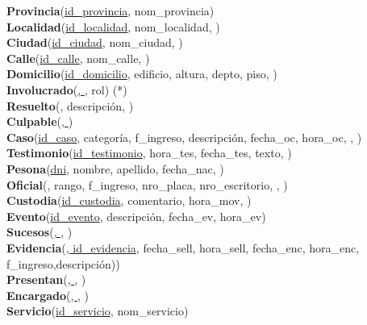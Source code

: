 \par
\noindent \textbf{Provincia}(\underline{id\_provincia}, nom\_provincia) \\
\textbf{Localidad}(\underline{id\_localidad}, nom\_localidad, )\\
\textbf{Ciudad}(\underline{id\_ciudad}, nom\_ciudad, )\\
\textbf{Calle}(\underline{id\_calle}, nom\_calle, )\\
\textbf{Domicilio}(\underline{id\_domicilio}, edificio, altura, depto, piso, )\\
\textbf{Involucrado}(\underline{, }, rol) (*)\\
\textbf{Resuelto}(\underline{}, descripción, )\\
\textbf{Culpable}(\underline{, })\\
\textbf{Caso}(\underline{id\_caso}, categoría, f\_ingreso, descripción, fecha\_oc, hora\_oc, , )\\
\textbf{Testimonio}(\underline{id\_testimonio}, hora\_tes, fecha\_tes, texto, )\\
\textbf{Pesona}(\underline{dni}, nombre, apellido, fecha\_nac, )\\
\textbf{Oficial}(\underline{}, rango, f\_ingreso, nro\_placa, nro\_escritorio, , )\\
\textbf{Custodia}(\underline{id\_custodia}, comentario, hora\_mov, )\\
\textbf{Evento}(\underline{id\_evento}, descripción, fecha\_ev, hora\_ev)\\
\textbf{Sucesos}(\underline{, }, )\\
\textbf{Evidencia}(\underline{, id\_evidencia}, fecha\_sell, hora\_sell, fecha\_enc, hora\_enc, f\_ingreso,descripción))\\
\textbf{Presentan}(\underline{, }, )\\
\textbf{Encargado}(\underline{, }, )\\
\textbf{Servicio}(\underline{id\_servicio}, nom\_servicio)\\
